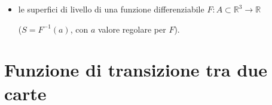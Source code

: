 \begin{esempio}
\begin{enumerate}[label=\arabic*)]
\begin{itemize}
                \textcolor{blu}{($S = \{(u, v, \varphi(u,v)) \mid (u,v) \in A\}$)} \textcolor{violet}{Abbiamo visto
                che si può ricoprire con una sola carta};
                \item le superfici di livello di una funzione differenziabile $F : A \subset \mathbb{R}^3 \to \mathbb{R}$ 
                
                \textcolor{blu}{($S = F^{-1}(a)$, con $a$ valore regolare per $F$)}.
            \end{itemize}
        \end{enumerate}
        \end{esempio}
    \section{Funzione di transizione tra due carte}
